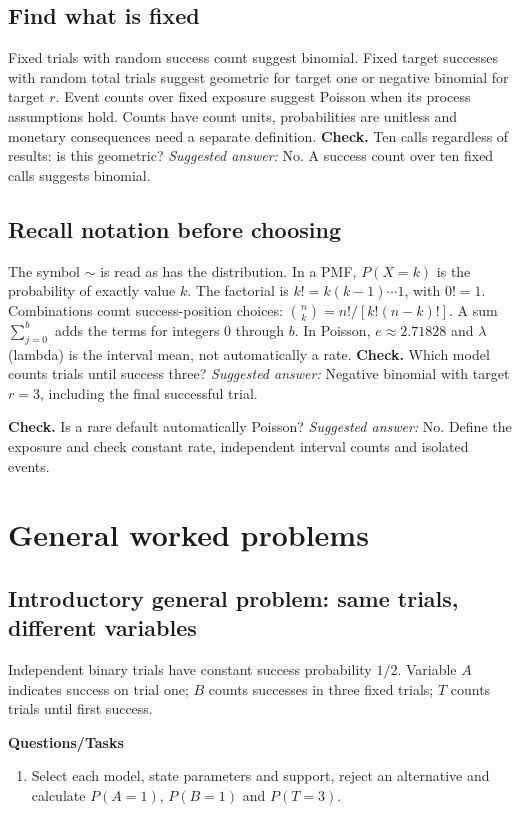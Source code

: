 \subsection{Find what is fixed}
Fixed trials with random success count suggest binomial. Fixed target successes with random total trials suggest geometric for target one or negative binomial for target $r$. Event counts over fixed exposure suggest Poisson when its process assumptions hold. Counts have count units, probabilities are unitless and monetary consequences need a separate definition.
\textbf{Check.} Ten calls regardless of results: is this geometric? \emph{Suggested answer:} No. A success count over ten fixed calls suggests binomial.


\subsection{Recall notation before choosing}
The symbol $\sim$ is read as has the distribution. In a PMF, $P(X=k)$ is the probability of exactly value $k$. The factorial is $k!=k(k-1)\cdots1$, with $0!=1$. Combinations count success-position choices: $\binom nk=n!/[k!(n-k)!]$. A sum $\sum_{j=0}^{b}$ adds the terms for integers 0 through $b$. In Poisson, $e\approx2.71828$ and $\lambda$ (lambda) is the interval mean, not automatically a rate.
\textbf{Check.} Which model counts trials until success three? \emph{Suggested answer:} Negative binomial with target $r=3$, including the final successful trial.

\textbf{Check.} Is a rare default automatically Poisson? \emph{Suggested answer:} No. Define the exposure and check constant rate, independent interval counts and isolated events.

\section{General worked problems}
\subsection{Introductory general problem: same trials, different variables}
Independent binary trials have constant success probability $1/2$. Variable $A$ indicates success on trial one; $B$ counts successes in three fixed trials; $T$ counts trials until first success.

\textbf{Questions/Tasks}
\begin{enumerate}
\item Select each model, state parameters and support, reject an alternative and calculate $P(A=1)$, $P(B=1)$ and $P(T=3)$.
\end{enumerate}
